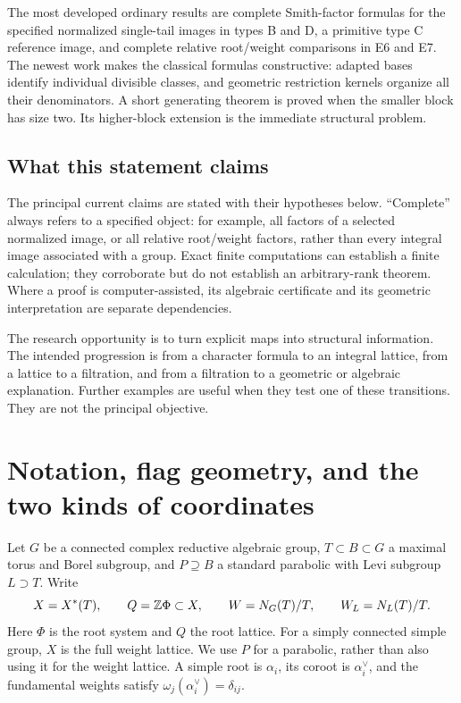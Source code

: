 The most developed ordinary results are complete Smith-factor formulas for the specified normalized single-tail images in types B and D, a primitive type C reference image, and complete relative root/weight comparisons in E6 and E7. The newest work makes the classical formulas constructive: adapted bases identify individual divisible classes, and geometric restriction kernels organize all their denominators. A short generating theorem is proved when the smaller block has size two. Its higher-block extension is the immediate structural problem.

\subsection{What this statement claims}
The principal current claims are stated with their hypotheses below. ``Complete'' always refers to a specified object: for example, all factors of a selected normalized image, or all relative root/weight factors, rather than every integral image associated with a group. Exact finite computations can establish a finite calculation; they corroborate but do not establish an arbitrary-rank theorem. Where a proof is computer-assisted, its algebraic certificate and its geometric interpretation are separate dependencies.

The research opportunity is to turn explicit maps into structural information. The intended progression is from a character formula to an integral lattice, from a lattice to a filtration, and from a filtration to a geometric or algebraic explanation. Further examples are useful when they test one of these transitions. They are not the principal objective.


\section{Notation, flag geometry, and the two kinds of coordinates}
Let $G$ be a connected complex reductive algebraic group, $T\subset B\subset G$ a maximal torus and Borel subgroup, and $P\supseteq B$ a standard parabolic with Levi subgroup $L\supset T$. Write
\[
 X=X^*(T),\qquad Q=\mathbb Z\Phi\subset X,\qquad
 W=N_G(T)/T,\qquad W_L=N_L(T)/T.
\]
Here $\Phi$ is the root system and $Q$ the root lattice. For a simply connected simple group, $X$ is the full weight lattice. We use $P$ for a parabolic, rather than also using it for the weight lattice. A simple root is $\alpha_i$, its coroot is $\alpha_i^\vee$, and the fundamental weights satisfy $\omega_j(\alpha_i^\vee)=\delta_{ij}$.

